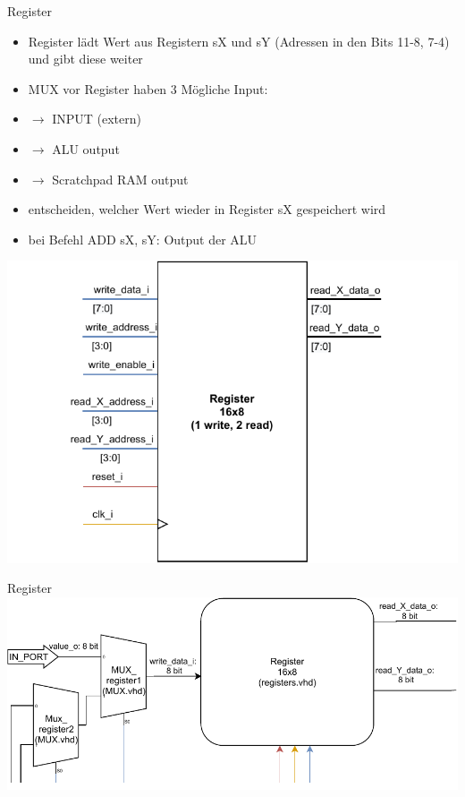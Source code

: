 \documentclass[10pt, t,
aspectratio=169,%
usenames,
dvipsnames,
]{beamer}
\begin{document}
	\begin{frame}{Register}
		\begin{multicols}{2}
		\begin{itemize}
			\item Register lädt Wert aus Registern sX und sY (Adressen in den Bits 11-8, 7-4) und gibt diese weiter
			\item MUX vor Register haben 3 Mögliche Input:
			\item $\rightarrow$ INPUT (extern)
			\item $\rightarrow$ ALU output
			\item $\rightarrow$ Scratchpad RAM output
			\item entscheiden, welcher Wert wieder in Register sX gespeichert wird
			\item bei Befehl ADD sX, sY: Output der ALU
		\end{itemize}
		\includegraphics[width=\linewidth]{../Blockbeschreibungen/Register_beschreibung.pdf}
		\end{multicols}
	\end{frame}

	\begin{frame}{Register}
		\includegraphics[width=\linewidth]{../Blockbeschreibungen/Register-BlockdiagramSnipits.pdf}
	\end{frame}
	
\end{document}
